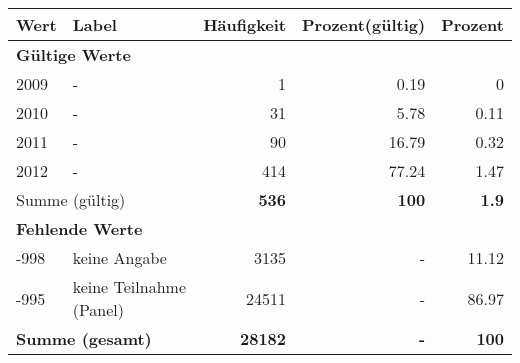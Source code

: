      \begin{longtable}{lXrrr}
     \toprule
     \textbf{Wert} & \textbf{Label} & \textbf{Häufigkeit} & \textbf{Prozent(gültig)} & \textbf{Prozent} \\
     \endhead
     \midrule
     \multicolumn{5}{l}{\textbf{Gültige Werte}}\\

     2009 &
     \multicolumn{1}{X}{ -  } &


       \num{1} &
       \num[round-mode=places,round-precision=2]{0,19} &
         \num[round-mode=places,round-precision=2]{0} \\

     2010 &
     \multicolumn{1}{X}{ -  } &


       \num{31} &
       \num[round-mode=places,round-precision=2]{5,78} &
         \num[round-mode=places,round-precision=2]{0,11} \\

     2011 &
     \multicolumn{1}{X}{ -  } &


       \num{90} &
       \num[round-mode=places,round-precision=2]{16,79} &
         \num[round-mode=places,round-precision=2]{0,32} \\

     2012 &
     \multicolumn{1}{X}{ -  } &


       \num{414} &
       \num[round-mode=places,round-precision=2]{77,24} &
         \num[round-mode=places,round-precision=2]{1,47} \\
     \midrule
     \multicolumn{2}{l}{Summe (gültig)} &
       \textbf{\num{536}} &
     \textbf{100} &
       \textbf{\num[round-mode=places,round-precision=2]{1,9}} \\
     \multicolumn{5}{l}{\textbf{Fehlende Werte}}\\
       -998 &
       keine Angabe &
         \num{3135} &
        - &
         \num[round-mode=places,round-precision=2]{11,12} \\
       -995 &
       keine Teilnahme (Panel) &
         \num{24511} &
        - &
         \num[round-mode=places,round-precision=2]{86,97} \\
     \midrule
     \multicolumn{2}{l}{\textbf{Summe (gesamt)}} &
          \textbf{\num{28182}} &
        \textbf{-} &
        \textbf{100} \\
     \bottomrule
     \end{longtable}
     
